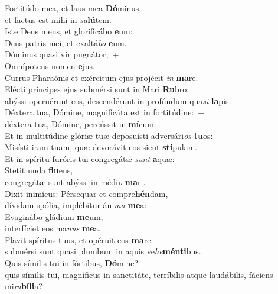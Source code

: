 \evenverse Fortitúdo mea, et laus mea \textbf{Dó}minus,~\*\\
\evenverse et factus est mihi in \textit{sa}\textbf{lú}tem.\\
\oddverse Iste Deus meus, et glorificábo \textbf{e}um:~\*\\
\oddverse Deus patris mei, et exaltá\textit{bo} \textbf{e}um.\\
\evenverse Dóminus quasi vir pugnátor,~+\\
\evenverse  Omnípotens nomen \textbf{e}jus.~\*\\
\evenverse Currus Pharaónis et exércitum ejus projécit \textit{in} \textbf{ma}re.\\
\oddverse Elécti príncipes ejus submérsi sunt in Mari \textbf{Ru}bro:~\*\\
\oddverse abýssi operuérunt eos, descendérunt in profúndum qua\textit{si} \textbf{la}pis.\\
\evenverse Déxtera tua, Dómine, magnificáta est in fortitúdine:~+\\
\evenverse  déxtera tua, Dómine, percússit ini\textbf{mí}cum.~\*\\
\evenverse Et in multitúdine glóriæ tuæ deposuísti adversári\textit{os} \textbf{tu}os:\\
\oddverse Misísti iram tuam, quæ devorávit eos sicut \textbf{stí}pulam.~\*\\
\oddverse Et in spíritu furóris tui congregátæ \textit{sunt} \textbf{a}quæ:\\
\evenverse Stetit unda \textbf{flu}ens,~\*\\
\evenverse congregátæ sunt abýssi in médi\textit{o} \textbf{ma}ri.\\
\oddverse Dixit inimícus: Pérsequar et compre\textbf{hén}dam,~\*\\
\oddverse dívidam spólia, implébitur áni\textit{ma} \textbf{me}a:\\
\evenverse Evaginábo gládium \textbf{me}um,~\*\\
\evenverse interfíciet eos ma\textit{nus} \textbf{me}a.\\
\oddverse Flavit spíritus tuus, et opéruit eos \textbf{ma}re:~\*\\
\oddverse submérsi sunt quasi plumbum in aquis ve\textit{he}\textbf{mén}\textbf{ti}bus.\\
\evenverse Quis símilis tui in fórtibus, \textbf{Dó}mine?~\*\\
\evenverse quis símilis tui, magníficus in sanctitáte, terríbilis atque laudábilis, fáciens mi\textit{ra}\textbf{bí}\textbf{li}a?\\
